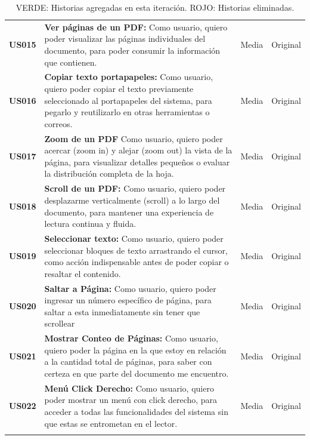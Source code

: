 \begin{longtable}{|l||p{7cm}|l|l|}
\textbf{US015} & 
\textbf{Ver páginas de un PDF:} Como usuario, quiero poder visualizar las páginas individuales del documento, para poder consumir la información que contienen. & Media & Original\\

\textbf{US016} & 
\textbf{Copiar texto portapapeles:} Como usuario, quiero poder copiar el texto previamente seleccionado al portapapeles del sistema, para pegarlo y reutilizarlo en otras herramientas o correos. & Media & Original\\

\textbf{US017} & 
\textbf{Zoom de un PDF} Como usuario, quiero poder acercar (zoom in) y alejar (zoom out) la vista de la página, para visualizar detalles pequeños o evaluar la distribución completa de la hoja. & Media & Original\\

\textbf{US018} & 
\textbf{Scroll de un PDF:} Como usuario, quiero poder desplazarme verticalmente (scroll) a lo largo del documento, para mantener una experiencia de lectura continua y fluida. & Media & Original\\

\textbf{US019} & 
\textbf{Seleccionar texto:} Como usuario, quiero poder seleccionar bloques de texto arrastrando el cursor, como acción indispensable antes de poder copiar o resaltar el contenido. & Media & Original\\

\textbf{US020} & 
\textbf{Saltar a Página:} Como usuario, quiero poder ingresar un número específico de página, para saltar a esta inmediatamente sin tener que scrollear & Media & Original\\

\textbf{US021} & 
\textbf{Mostrar Conteo de Páginas:} Como usuario, quiero poder la página en la que estoy en relación a la cantidad total de páginas, para saber con certeza en que parte del documento me encuentro. & Media & Original\\

\textbf{US022} & 
\textbf{Menú Click Derecho:} Como usuario, quiero poder mostrar un menú con click derecho, para acceder a todas las funcionalidades del sistema sin que estas se entrometan en el lector. & Media & Original\\
\hline

\caption{\color{ForestGreen}VERDE: Historias agregadas en esta iteración. \color{Mahogany}ROJO: Historias eliminadas.}
\label{ProductBacklog}

\end{longtable}

